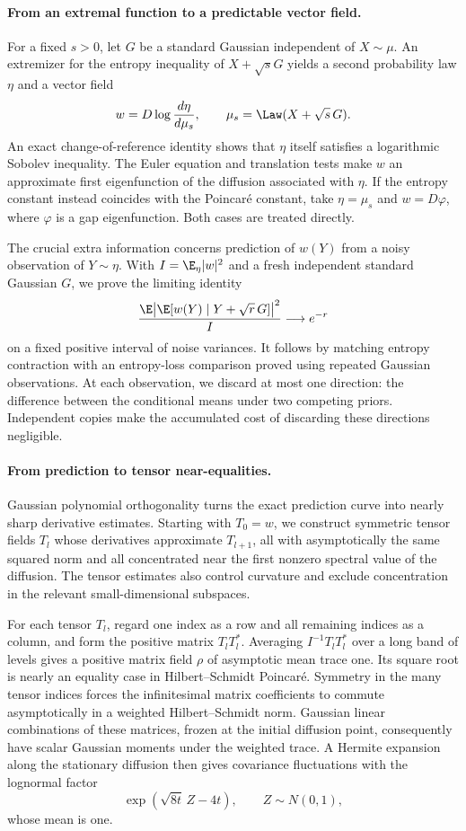 \paragraph{From an extremal function to a predictable vector field.}
For a fixed \(s>0\), let \(G\) be a standard Gaussian independent of
\(X\sim\mu\).  An extremizer for the entropy inequality of
\(X+\sqrt sG\) yields a second probability law
\(\eta\) and a vector field
\[
 w=D\log\frac{d\eta}{d\mu_s},
 \qquad \mu_s=\Law(X+\sqrt s\,G).
\]
An exact change-of-reference identity shows that \(\eta\) itself
satisfies a logarithmic Sobolev inequality.
The Euler equation and translation tests make \(w\) an approximate
first eigenfunction of the diffusion associated with \(\eta\).
If the entropy constant instead coincides with the Poincar\'e
constant, take \(\eta=\mu_s\) and \(w=D\varphi\), where
\(\varphi\) is a gap eigenfunction.  Both cases are treated directly.

The crucial extra information concerns prediction of \(w(Y)\) from
a noisy observation of \(Y\sim\eta\).  With
\(I=\E_\eta|w|^2\) and a fresh independent standard Gaussian \(G\),
we prove the limiting identity
\[
 \frac{\E\big|\E[w(Y)\mid Y+\sqrt r\,G]\big|^2}{I}
 \longrightarrow e^{-r}
\]
on a fixed positive interval of noise variances.
It follows by matching entropy contraction with an entropy-loss
comparison proved using repeated Gaussian observations.
At each observation, we discard at most one direction: the difference
between the conditional means under two competing priors.
Independent copies make the accumulated cost of discarding these
directions negligible.

\paragraph{From prediction to tensor near-equalities.}
Gaussian polynomial orthogonality turns the exact prediction curve
into nearly sharp derivative estimates.
Starting with \(T_0=w\), we construct symmetric tensor fields \(T_l\)
whose derivatives approximate \(T_{l+1}\), all with asymptotically the
same squared norm and all concentrated near the first nonzero spectral value
of the diffusion.  The tensor estimates also control curvature and
exclude concentration in the relevant small-dimensional subspaces.

For each tensor \(T_l\), regard one index as a row and all remaining
indices as a column, and form the positive matrix \(T_lT_l^*\).
Averaging \(I^{-1}T_lT_l^*\) over a long band of levels gives a
positive matrix field \(\rho\) of asymptotic mean trace one.  Its square root is nearly an equality case in
Hilbert--Schmidt Poincar\'e.  Symmetry in the many tensor indices
forces the infinitesimal matrix coefficients to commute
asymptotically in a weighted Hilbert--Schmidt norm.  Gaussian linear combinations of these matrices, frozen at the initial
diffusion point, consequently have scalar Gaussian moments under the
weighted trace.  A Hermite expansion along the stationary diffusion
then gives covariance fluctuations with the lognormal factor
\[
 \exp(\sqrt{8t}\,Z-4t),\qquad Z\sim N(0,1),
\]
whose mean is one.

